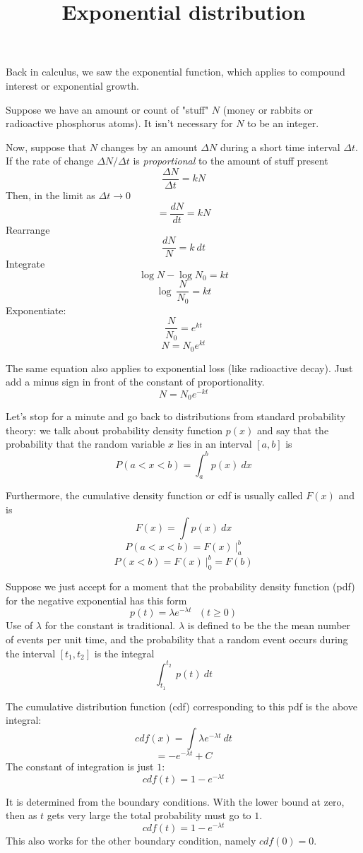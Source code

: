 \documentclass[11pt, oneside]{article}   	%
\title{Exponential distribution}
\date{}							%
\begin{document}
\maketitle
\Large
Back in calculus, we saw the exponential function, which applies to compound interest or exponential growth.  

Suppose we have an amount or count of "stuff" $N$ (money or rabbits or radioactive phosphorus atoms).  It isn't necessary for $N$ to be an integer.

Now, suppose that $N$ changes by an amount $\Delta N$ during a short time interval $\Delta t$.  If the rate of change $\Delta N/\Delta t$ is \emph{proportional} to the amount of stuff present 
\[ \frac{\Delta N}{\Delta t} = k N \]
Then, in the limit as $\Delta t \rightarrow 0$
\[ = \frac{dN}{dt} = k N \]
Rearrange
\[ \frac{dN}{N} = k \ dt \]
Integrate
\[ \log N - \log N_0 =  kt \]
\[ \log \ \frac{N}{N_0} =  kt \]
Exponentiate:
\[ \frac{N}{N_0} = e^{kt} \]
\[ N = N_0 e^{kt} \]

The same equation also applies to exponential loss (like radioactive decay).  Just add a minus sign in front of the constant of proportionality.
\[ N = N_0 e^{-kt} \]

Let's stop for a minute and go back to distributions from standard probability theory:   we talk about probability density function $p(x)$ and say that the probability that the random variable $x$ lies in an interval $[a,b]$ is
\[ P(a < x < b) = \int_a^b p(x) \ dx \]

Furthermore, the cumulative density function or cdf is usually called $F(x)$ and is
\[ F(x) = \int p(x) \ dx \]
\[ P(a < x < b) = F(x) \ \bigg |_a^b \]
\[ P( x < b) = F(x) \ \bigg |_0^b = F(b) \]

Suppose we just accept for a moment that the probability density function (pdf) for the negative exponential has this form
\[ p(t) = \lambda e^{-\lambda t} \ \ \ (t \ge 0) \]
Use of $\lambda$ for the constant is traditional.  $\lambda$ is defined to be the the mean number of events per unit time, and the probability that a random event occurs during the interval $[t_1,t_2]$ is the integral
\[ \int_{t_1}^{t_2} \ p(t) \ dt \]

The cumulative distribution function (cdf) corresponding to this pdf is the above integral:
\[ cdf(x) = \int \lambda e^{-\lambda t} \ dt \]
\[ =  - e^{-\lambda t} + C \]
The constant of integration is just $1$:
\[ cdf(t) = 1 - e^{-\lambda t} \]

It is determined from the boundary conditions.  With the lower bound at zero, then as $t$ gets very large the total probability must go to $1$.
\[ cdf(t) = 1 - e^{-\lambda t} \]
This also works for the other boundary condition, namely $cdf(0) = 0$.
\end{document}
